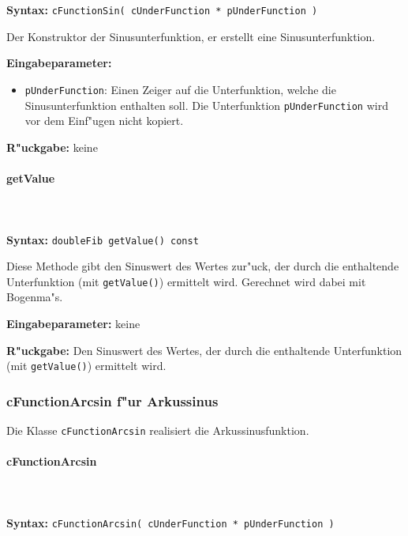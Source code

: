 \ \\\\\noindent
\textbf{Syntax:} \verb|cFunctionSin( cUnderFunction * pUnderFunction )|

\bigskip\noindent
Der Konstruktor der Sinusunterfunktion, er erstellt eine Sinusunterfunktion.

\bigskip\noindent
\textbf{Eingabeparameter:}
\begin{itemize}
 \item \verb|pUnderFunction|: Einen Zeiger auf die Unterfunktion, welche die Sinusunterfunktion enthalten soll. Die Unterfunktion \verb|pUnderFunction| wird vor dem Einf"ugen nicht kopiert.
\end{itemize}

\bigskip\noindent
\textbf{R"uckgabe:} keine


\paragraph{getValue}

\ \\\\\noindent
\textbf{Syntax:} \verb|doubleFib getValue() const|

\bigskip\noindent
Diese Methode gibt den Sinuswert des Wertes zur"uck, der durch die enthaltende Unterfunktion (mit \verb|getValue()|) ermittelt wird. Gerechnet wird dabei mit Bogenma"s.

\bigskip\noindent
\textbf{Eingabeparameter:} keine

\bigskip\noindent
\textbf{R"uckgabe:} Den Sinuswert des Wertes, der durch die enthaltende Unterfunktion (mit \verb|getValue()|) ermittelt wird.


\subsubsection{cFunctionArcsin f"ur Arkussinus}

Die Klasse \verb|cFunctionArcsin| realisiert die Arkussinusfunktion.

\paragraph{cFunctionArcsin}

\ \\\\\noindent
\textbf{Syntax:} \verb|cFunctionArcsin( cUnderFunction * pUnderFunction )|

